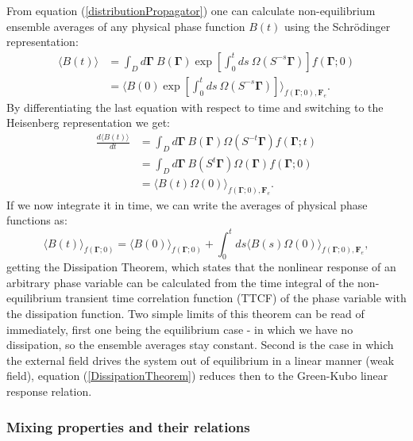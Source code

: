 \documentclass[a4paper,12pt]{article}
\begin{document}
From equation (\ref{distributionPropagator}) one can calculate non-equilibrium ensemble averages of any physical phase function $B(t)$ using the Schrödinger representation:
\begin{equation}
\begin{aligned}
	  \langle B(t) \rangle &= \int_D d\bm{\Gamma}\ B(\bm{\Gamma})\exp[\int_0^{t} ds\ \Omega(S^{-s}\bm{\Gamma})]f(\bm{\Gamma};0)\\
	  &= \langle B(0) \exp[\int_0^{t} ds\ \Omega(S^{-s}\bm{\Gamma})] \rangle_{f(\bm{\Gamma};0),\bm{F}_e}.
\end{aligned}
\end{equation}
By differentiating the last equation with respect to time and switching to the Heisenberg representation we get:
\begin{equation}
\begin{aligned}
 \frac{d\langle B(t) \rangle}{dt}
 &= \int_D d\bm{\Gamma}\ B(\bm{\Gamma}) \Omega(S^{-t}\bm{\Gamma}) f(\bm{\Gamma};t)\\
&= \int_D d\bm{\Gamma}\ B(S^t \bm{\Gamma}) \Omega(\bm{\Gamma})f(\bm{\Gamma};0)\\
&= \langle B(t)\Omega(0) \rangle_{f(\bm{\Gamma};0),\bm{F}_e}.
\end{aligned}
\end{equation}
If we now integrate it in time, we can write the averages of physical phase functions as:
\begin{equation}
\label{DissipationTheorem}
\langle B(t)\rangle_{f(\bm{\Gamma};0)} =\langle B(0) \rangle_{f(\bm{\Gamma};0)} +\int_0^t ds \langle B(s) \Omega(0) \rangle_{f(\bm{\Gamma};0),\bm{F}_e}, 
\end{equation}
getting the Dissipation Theorem, which states that the nonlinear response of an arbitrary phase variable can be calculated from the time integral of the non-equilibrium transient time correlation function (TTCF) of the phase variable with the dissipation function.
Two simple limits of this theorem can be read of immediately, first one being the equilibrium case - in which we have no dissipation, so the ensemble averages stay constant. Second is the case in which the external field drives the system out of equilibrium in a linear manner (weak field), equation (\ref{DissipationTheorem}) reduces then to the Green-Kubo linear response relation.

\subsubsection{Mixing properties and their relations}
\end{document}
